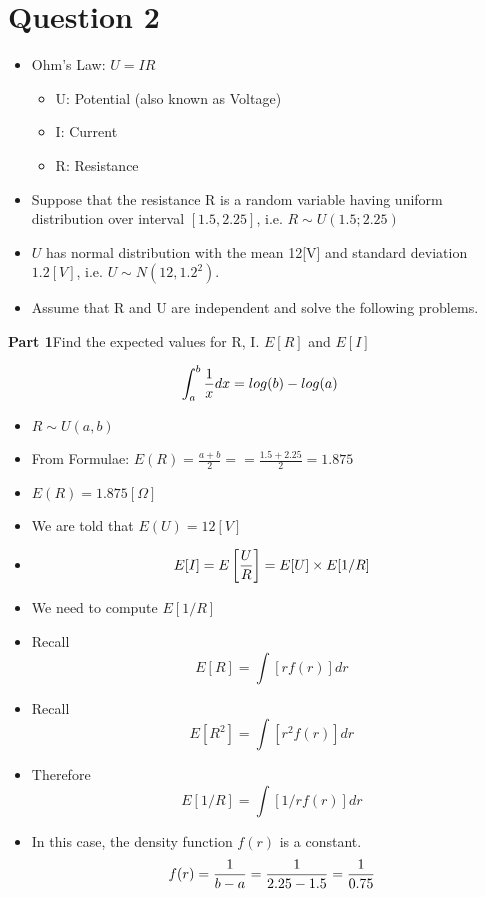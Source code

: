 


\section*{Question 2}

\begin{itemize}
\item Ohm's Law: $U = IR$

\begin{itemize}
\item U: Potential (also known as Voltage)
\item I: Current
\item R: Resistance
\end{itemize}

\item Suppose that the resistance R is a random
variable having uniform distribution over interval $[1.5, 2.25]$, i.e. $R \sim U(1.5; 2.25)$ \item $U$ has normal
distribution with the mean 12[V] and standard deviation $1.2[V]$, i.e. $U \sim N(12, 1.2^2)$.\item Assume that
R and U are independent and solve the following problems.
\end{itemize}



\noindent\textbf{Part 1}Find the expected values for R, I. $E[R]$ and $E[I]$

\[ \int^b_a {1 \over x} dx =log(b) - log(a) \]

\begin{itemize}
\item $R \sim U(a,b)$
\item From Formulae:  $E(R) = \frac{a+b}{2} = = \frac{1.5 +2.25 }{2} =1.875 $
\item $E(R) = 1.875[ \Omega]$
\bigskip
\item We are told that $E(U) = 12 [V] $

\item \[ E[I] = E \left[{U \over R} \right] =  E[U] \times E[1/R] \]
\item We need to compute $E[1/R]$

\item Recall \[E[R] =  \int \left[ r f(r) \right] dr \]
\item Recall \[E[R^2] = \int \left[ r^2 f(r)\right] dr\]
\item Therefore \[ E[1/R] =  \int \left[1/r f(r)\right] dr  \]
\item In this case, the density function $f(r)$ is a constant.
\[f(r) = {1 \over b-a}  = {1 \over 2.25 - 1.5} = {1\over 0.75}\]

\end{itemize}



